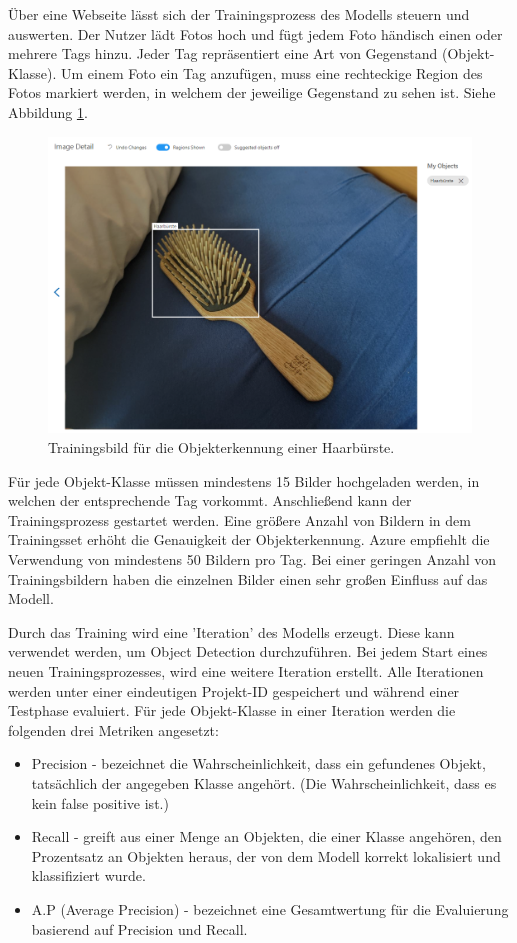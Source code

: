 Über eine Webseite lässt sich der Trainingsprozess des Modells steuern und auswerten. Der Nutzer lädt Fotos hoch und fügt jedem Foto händisch einen oder mehrere Tags hinzu. Jeder Tag repräsentiert eine Art von Gegenstand (Objekt-Klasse). Um einem Foto ein Tag anzufügen, muss eine rechteckige Region des Fotos markiert werden, in welchem der jeweilige Gegenstand zu sehen ist. Siehe Abbildung \ref{img:trainingone}.

\begin{figure}[H]
	\centering
	\includegraphics[width=1\textwidth]{images/trainingone.png}
	\caption[Trainingsbild für Azrue Custom Detection]{Trainingsbild für die Objekterkennung einer Haarbürste.}
	\label{img:trainingone}
\end{figure}

Für jede Objekt-Klasse müssen mindestens 15 Bilder hochgeladen werden, in welchen der entsprechende Tag vorkommt. Anschließend kann der Trainingsprozess gestartet werden. Eine größere Anzahl von Bildern in dem Trainingsset erhöht die Genauigkeit der Objekterkennung. Azure empfiehlt die Verwendung von mindestens 50 Bildern pro Tag. Bei einer geringen Anzahl von Trainingsbildern haben die einzelnen Bilder einen sehr großen Einfluss auf das Modell.

Durch das Training wird eine 'Iteration' des Modells erzeugt. Diese kann verwendet werden, um Object Detection durchzuführen. Bei jedem Start eines neuen Trainingsprozesses, wird eine weitere Iteration erstellt. Alle Iterationen werden unter einer eindeutigen Projekt-ID gespeichert und während einer Testphase evaluiert. Für jede Objekt-Klasse in einer Iteration werden die folgenden drei Metriken angesetzt:
\begin{itemize}
	\item Precision - bezeichnet die Wahrscheinlichkeit, dass ein gefundenes Objekt, tatsächlich der angegeben Klasse angehört. (Die Wahrscheinlichkeit, dass es kein false positive ist.)
	\item Recall - greift aus einer Menge an Objekten, die einer Klasse angehören, den Prozentsatz an Objekten heraus, der von dem Modell korrekt lokalisiert und klassifiziert wurde.
	\item A.P (Average Precision) - bezeichnet eine Gesamtwertung für die Evaluierung basierend auf Precision und Recall. 
\end{itemize}

